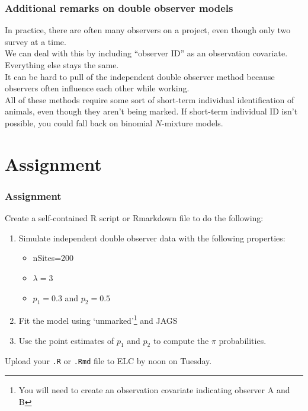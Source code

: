 \documentclass[color=usenames,dvipsnames]{beamer}\usepackage[]{graphicx}\usepackage[]{xcolor}
\begin{document}
\begin{frame}
  \frametitle{Additional remarks on double observer models}
  In practice, there are often many observers on a project, even
  though only two survey at a time. \\
  \pause
  \vfill
  We can deal with this by including ``observer ID'' as an observation
  covariate. Everything else stays the same. \\
  \pause
  \vfill
  It can be hard to pull of the independent double observer method
  because observers often influence each other while working. \\
  \pause
  \vfill
  All of these methods require some sort of \alert{short-term}
  individual identification of animals, even though they aren't being
  marked.
  \pause
  \vfill
  If short-term individual ID isn't possible, you could fall
  back on binomial $N$-mixture models.
\end{frame}




\section{Assignment}




\begin{frame}[fragile]
  \frametitle{Assignment}
  \footnotesize
  Create a self-contained R script or Rmarkdown file
  to do the following:
  \vfill
  \begin{enumerate}
    \footnotesize
    \item Simulate \alert{independent} double observer data with the following
      properties:
      \begin{itemize}
        \item nSites=200
        \item $\lambda=3$
        \item $p_1=0.3$ and $p_2=0.5$
      \end{itemize}
    \item Fit the model using `unmarked'\footnote{\scriptsize You will
        need to create an observation covariate indicating observer A
        and B} and JAGS
    \item Use the point estimates of $p_1$ and $p_2$ to compute the $\pi$ probabilities. 
  \end{enumerate}
  \vfill
  Upload your {\tt .R} or {\tt .Rmd} file to ELC by noon on Tuesday.
\end{frame}
\end{document}
